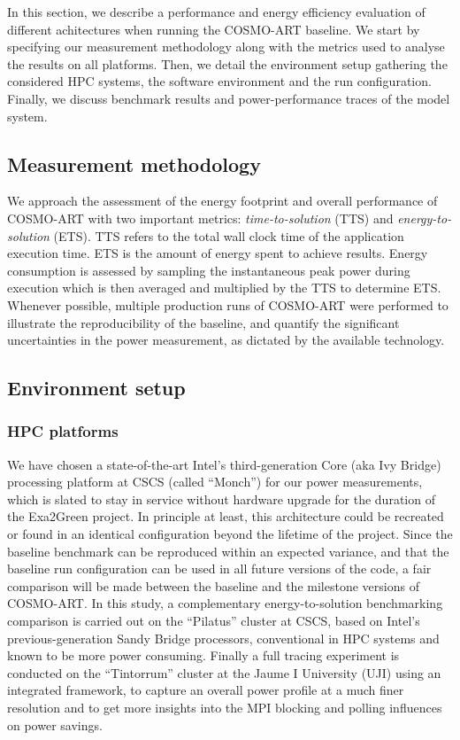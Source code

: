 In  this section,  we  describe a  performance  and energy  efficiency
evaluation  of  different  achitectures  when  running  the  COSMO-ART
baseline.  We  start by  specifying our measurement  methodology along
with the metrics used to  analyse the results on all platforms.  Then,
we detail the environment  setup gathering the considered HPC systems,
the  software  environment and  the  run  configuration.  Finally,  we
discuss benchmark  results and  power-performance traces of  the model
system.

\subsection{Measurement methodology}
\label{subsec:4.1}
We  approach  the  assessment  of  the energy  footprint  and  overall
performance    of    COSMO-ART    with    two    important    metrics:
\textit{time-to-solution} (TTS) and \textit{energy-to-solution} (ETS).
TTS refers to  the total wall clock time  of the application execution
time. ETS  is the amount of  energy spent to  achieve results.  Energy
consumption  is  assessed by  sampling  the  instantaneous peak  power
during execution which  is then averaged and multiplied  by the TTS to
determine  ETS.   Whenever   possible,  multiple  production  runs  of
COSMO-ART  were performed  to  illustrate the  reproducibility of  the
baseline,  and quantify  the  significant uncertainties  in the  power
measurement, as dictated by the available technology.

\subsection{Environment setup}
\label{subsec:4.2}

\subsubsection{HPC platforms}
We have  chosen a state-of-the-art Intel's  third-generation Core (aka
Ivy  Bridge) processing platform  at CSCS  (called ``Monch'')  for our
power  measurements,  which  is  slated  to stay  in  service  without
hardware  upgrade  for the  duration  of  the  Exa2Green project.   In
principle at least,  this architecture could be recreated  or found in
an identical configuration beyond  the lifetime of the project.  Since
the baseline benchmark can  be reproduced within an expected variance,
and  that the baseline  run configuration  can be  used in  all future
versions  of the  code, a  fair comparison  will be  made  between the
baseline and  the milestone versions  of COSMO-ART.  In this  study, a
complementary  energy-to-solution benchmarking  comparison  is carried
out   on  the   ``Pilatus''  cluster   at  CSCS,   based   on  Intel's
previous-generation  Sandy  Bridge  processors,  conventional  in  HPC
systems and known to be  more power consuming.  Finally a full tracing
experiment is  conducted on the  ``Tintorrum'' cluster at the  Jaume I
University (UJI) using an  integrated framework, to capture an overall
power profile at a much finer resolution and to get more insights into
the MPI blocking and polling influences on power savings.


